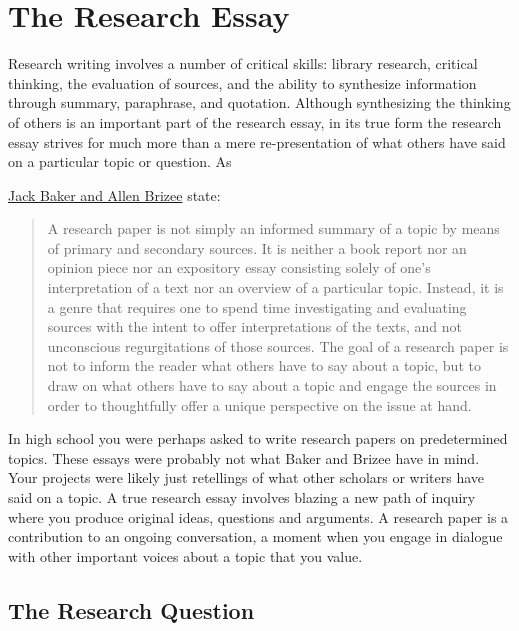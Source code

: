 
\chapter{The Research Essay}
Research writing involves a number of critical skills: library research, 
critical thinking, the evaluation of sources, and the ability to synthesize 
information through summary, paraphrase, and quotation. Although synthesizing 
the thinking of others is an important part of the research essay, in its true 
form the research essay strives for much more than a mere re-presentation of 
what others have said on a particular topic or question. As 

\href{http://owl.english.purdue.edu/owl/resource/658/02/}{Jack Baker and Allen Brizee} state:

\begin{quote}A research paper is not simply an informed summary of a topic by 
means of primary and secondary sources. It is neither a book report nor an 
opinion piece nor an expository essay consisting solely of one's interpretation 
of a text nor an overview of a particular topic. Instead, it is a genre that 
requires one to spend time investigating and evaluating sources with the intent 
to offer interpretations of the texts, and not unconscious regurgitations of 
those sources. The goal of a research paper is not to inform the reader what 
others have to say about a topic, but to draw on what others have to say about 
a topic and engage the sources in order to thoughtfully offer a unique 
perspective on the issue at hand.\end{quote}

In high school you were perhaps asked to write research papers on predetermined 
topics. These essays were probably not what Baker and Brizee have in mind. Your 
projects were likely just retellings of what other scholars or writers have 
said on a topic. A true research essay involves blazing a new path of inquiry 
where you produce original ideas, questions and arguments. A research paper is 
a contribution to an ongoing conversation, a moment when you engage in dialogue 
with other important voices about a topic that you value.

\section{The Research Question}

